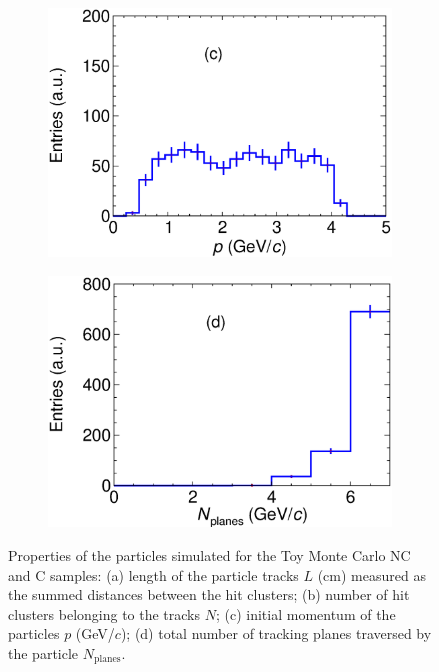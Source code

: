 \begin{figure}[t]
\begin{subfigure}[b]{0.48\textwidth}
         \includegraphics[width=\textwidth]{figures/ch4-KF_NDGArLite/Toy/pAllTall.eps}
         \caption{}
         \label{fig:ToyGArLite_p}
     \end{subfigure}
     \begin{subfigure}[b]{0.48\textwidth}
         \centering
         \includegraphics[width=\textwidth]{figures/ch4-KF_NDGArLite/Toy/NPlanesAllTall.eps}
         \caption{}
         \label{fig:ToyGArLite_planes}
     \end{subfigure}
        \caption{Properties of the particles simulated for the Toy Monte Carlo NC and C samples: (a) length of the particle tracks $L$ (cm) measured as the summed distances between the hit clusters; (b) number of hit clusters belonging to the tracks $N$; (c) initial momentum of the particles $p$ (GeV/$c$); (d) total number of tracking planes traversed by the particle $N_\text{planes}.$} \label{fig:ToyGArLite_prop}
\end{figure}

